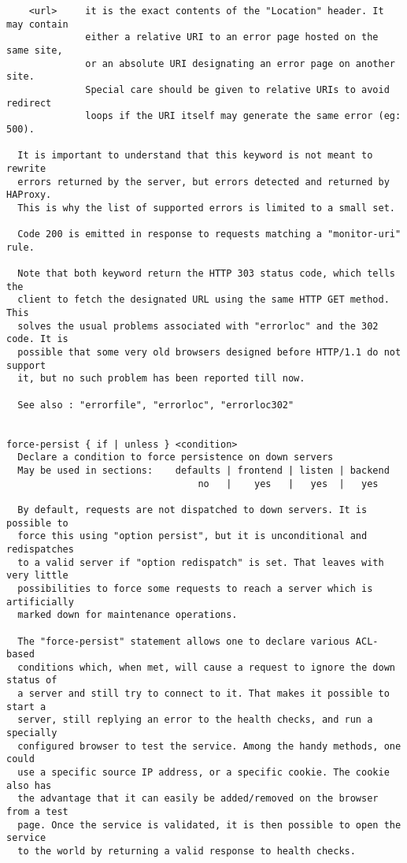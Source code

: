 \begin{verbatim}
    <url>     it is the exact contents of the "Location" header. It may contain
              either a relative URI to an error page hosted on the same site,
              or an absolute URI designating an error page on another site.
              Special care should be given to relative URIs to avoid redirect
              loops if the URI itself may generate the same error (eg: 500).

  It is important to understand that this keyword is not meant to rewrite
  errors returned by the server, but errors detected and returned by HAProxy.
  This is why the list of supported errors is limited to a small set.

  Code 200 is emitted in response to requests matching a "monitor-uri" rule.

  Note that both keyword return the HTTP 303 status code, which tells the
  client to fetch the designated URL using the same HTTP GET method. This
  solves the usual problems associated with "errorloc" and the 302 code. It is
  possible that some very old browsers designed before HTTP/1.1 do not support
  it, but no such problem has been reported till now.

  See also : "errorfile", "errorloc", "errorloc302"


force-persist { if | unless } <condition>
  Declare a condition to force persistence on down servers
  May be used in sections:    defaults | frontend | listen | backend
                                  no   |    yes   |   yes  |   yes

  By default, requests are not dispatched to down servers. It is possible to
  force this using "option persist", but it is unconditional and redispatches
  to a valid server if "option redispatch" is set. That leaves with very little
  possibilities to force some requests to reach a server which is artificially
  marked down for maintenance operations.

  The "force-persist" statement allows one to declare various ACL-based
  conditions which, when met, will cause a request to ignore the down status of
  a server and still try to connect to it. That makes it possible to start a
  server, still replying an error to the health checks, and run a specially
  configured browser to test the service. Among the handy methods, one could
  use a specific source IP address, or a specific cookie. The cookie also has
  the advantage that it can easily be added/removed on the browser from a test
  page. Once the service is validated, it is then possible to open the service
  to the world by returning a valid response to health checks.


\end{verbatim}

